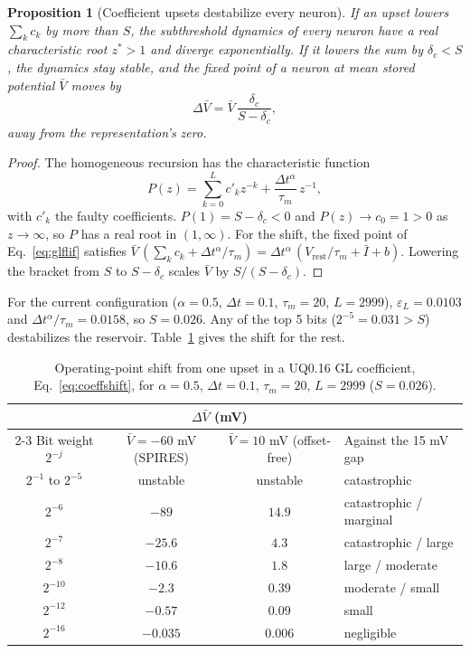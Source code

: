 \documentclass[11pt,a4paper]{article}
\newcommand{\dta}{\Delta t^{\alpha}}
\newtheorem{proposition}{Proposition}
\begin{document}
\begin{proposition}[Coefficient upsets destabilize every neuron]
\label{prop:coeff}
If an upset lowers $\sum_{k} c_k$ by more than $S$, the subthreshold dynamics of every neuron have a real characteristic root $z^{*} > 1$ and diverge exponentially. If it lowers the sum by $\delta_c < S$, the dynamics stay stable, and the fixed point of a neuron at mean stored potential $\bar V$ moves by
\begin{equation}
\Delta \bar V = \bar V\, \frac{\delta_c}{S - \delta_c},
\label{eq:coeffshift}
\end{equation}
away from the representation's zero.
\end{proposition}
\begin{proof}
The homogeneous recursion has the characteristic function
\[
P(z) = \sum_{k=0}^{L} c'_k z^{-k} + \frac{\dta}{\tau_m}\, z^{-1},
\]
with $c'_k$ the faulty coefficients. $P(1) = S - \delta_c < 0$ and $P(z) \to c_0 = 1 > 0$ as $z\to\infty$, so $P$ has a real root in $(1,\infty)$. For the shift, the fixed point of Eq.~\eqref{eq:glflif} satisfies $\bar V\,(\sum_k c_k + \dta/\tau_m) = \dta\,(V_{\mathrm{rest}}/\tau_m + \bar I + b)$. Lowering the bracket from $S$ to $S - \delta_c$ scales $\bar V$ by $S/(S-\delta_c)$.
\end{proof}

For the current configuration ($\alpha = 0.5$, $\Delta t = 0.1$, $\tau_m = 20$, $L = 2999$), $\varepsilon_L = 0.0103$ and $\dta/\tau_m = 0.0158$, so $S = 0.026$. Any of the top 5 bits ($2^{-5} = 0.031 > S$) destabilizes the reservoir. Table~\ref{tab:coeff} gives the shift for the rest.

\begin{table}[h]
\centering
\small
\begin{tabular}{@{}cccl@{}}
\toprule
 & \multicolumn{2}{c}{$\Delta\bar V$ (mV)} & \\
\cmidrule(lr){2-3}
Bit weight $2^{-j}$ & $\bar V = -60$ mV (SPIRES) & $\bar V = 10$ mV (offset-free) & Against the 15 mV gap \\
\midrule
$2^{-1}$ to $2^{-5}$ & unstable & unstable & catastrophic \\
$2^{-6}$ & $-89$ & $14.9$ & catastrophic / marginal \\
$2^{-7}$ & $-25.6$ & $4.3$ & catastrophic / large \\
$2^{-8}$ & $-10.6$ & $1.8$ & large / moderate \\
$2^{-10}$ & $-2.3$ & $0.39$ & moderate / small \\
$2^{-12}$ & $-0.57$ & $0.09$ & small \\
$2^{-16}$ & $-0.035$ & $0.006$ & negligible \\
\bottomrule
\end{tabular}
\caption{Operating-point shift from one upset in a UQ0.16 GL coefficient, Eq.~\eqref{eq:coeffshift}, for $\alpha = 0.5$, $\Delta t = 0.1$, $\tau_m = 20$, $L = 2999$ ($S = 0.026$).}
\label{tab:coeff}
\end{table}
\end{document}
